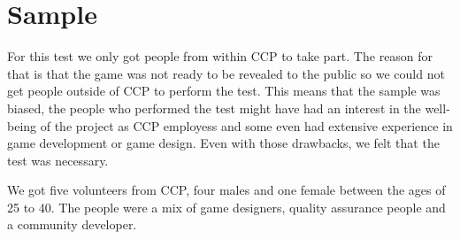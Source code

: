 \section{Sample}\label{sec:sample}
For this test we only got people from within CCP to take part. The reason for that is that the game was not ready to be revealed to the public so we could not get people outside of CCP to perform the test. This means that the sample was biased, the people who performed the test might have had an interest in the well-being of the project as CCP employess and some even had extensive experience in game development or game design. Even with those drawbacks, we felt that the test was necessary. 

We got five volunteers from CCP, four males and one female between the ages of 25 to 40. The people were a mix of game designers, quality assurance people and a community developer.